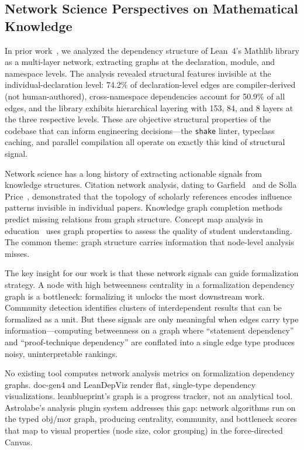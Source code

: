 \subsection{Network Science Perspectives on Mathematical Knowledge}
\label{sec:bg-network-science}

In prior work~\cite{LiPengSeverini2026}, we analyzed the dependency structure of Lean~4's Mathlib library as a multi-layer network, extracting graphs at the declaration, module, and namespace levels. The analysis revealed structural features invisible at the individual-declaration level: 74.2\% of declaration-level edges are compiler-derived (not human-authored), cross-namespace dependencies account for 50.9\% of all edges, and the library exhibits hierarchical layering with 153, 84, and 8 layers at the three respective levels. These are objective structural properties of the codebase that can inform engineering decisions---the \texttt{shake} linter, typeclass caching, and parallel compilation all operate on exactly this kind of structural signal.

Network science has a long history of extracting actionable signals from knowledge structures. Citation network analysis, dating to Garfield~\cite{Garfield1955} and de Solla Price~\cite{Price1965}, demonstrated that the topology of scholarly references encodes influence patterns invisible in individual papers. Knowledge graph completion methods~\cite{Bordes2013} predict missing relations from graph structure. Concept map analysis in education~\cite{Novak2008} uses graph properties to assess the quality of student understanding. The common theme: graph structure carries information that node-level analysis misses.

The key insight for our work is that these network signals can guide formalization strategy. A node with high betweenness centrality in a formalization dependency graph is a bottleneck: formalizing it unlocks the most downstream work. Community detection identifies clusters of interdependent results that can be formalized as a unit. But these signals are only meaningful when edges carry type information---computing betweenness on a graph where ``statement dependency'' and ``proof-technique dependency'' are conflated into a single edge type produces noisy, uninterpretable rankings.

No existing tool computes network analysis metrics on formalization dependency graphs. doc-gen4 and LeanDepViz render flat, single-type dependency visualizations. leanblueprint's graph is a progress tracker, not an analytical tool. Astrolabe's analysis plugin system addresses this gap: network algorithms run on the typed obj/mor graph, producing centrality, community, and bottleneck scores that map to visual properties (node size, color grouping) in the force-directed Canvas.


